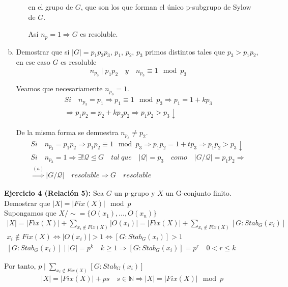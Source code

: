 \documentclass{article}
\begin{document}
\begin{enumerate}[(a)]
\begin{enumerate}[\bfseries C{a}so 1:]
	en el grupo de $G$, que son los que forman el único p-subgrupo de Sylow de $G$. 
	
	Así $n_p=1\Rightarrow G$ es resoluble. 
	\end{enumerate}

\item Demostrar que si $|G|=p_1p_2p_3$, $p_1,\,p_2,\,p_3$ primos distintos tales que $p_3>p_1p_2$, en ese caso $G$ es resoluble
\begin{equation*}
n_{p_3}\mid p_1p_2\quad y\quad n_{p_3}\equiv 1\mod{p_3}
\end{equation*}

Veamos que necesariamente $n_{p_3}=1$.
\begin{gather*}
Si\quad n_{p_3}=p_1\Rightarrow p_1\equiv 1\mod{p_3} \Rightarrow p_1=1+kp_3 \\
\Rightarrow p_1p_2=p_2+kp_3p_2\Rightarrow p_1p_2>p_3\downarrow
\end{gather*}

De la misma forma se demuestra $n_{p_3}\neq p_2$. 
\begin{gather*}
Si\quad n_{p_3}=p_1p_2 \Rightarrow p_1p_2\equiv 1\mod{p_3}\Rightarrow p_1p_2=1+tp_3 \Rightarrow p_1p_2>p_3\downarrow \\
Si\quad n_{p_3}=1\Rightarrow \exists!\mathcal{Q}\unlhd G\quad tal\:que\quad |\mathcal{Q}|=p_3 \quad como \quad |G/\mathcal{Q}|=p_1p_2\Rightarrow \\
\overset{(a)}{\Rightarrow} |G/\mathcal{Q}|\quad resoluble \Rightarrow G\quad resoluble
\end{gather*}
\end{enumerate}

\textbf{Ejercicio 4 (Relación 5):} Sea $G$ un p-grupo y $X$ un G-conjunto finito. Demostrar que $|X|=|Fix(X)|\mod{p}$ \\

Supongamos que $X/\sim=\{O(x_1),\ldots,O(x_n)\}$
\begin{gather*}
|X|=|Fix(X)|+\sum_{x_i\notin Fix(X)}|O(x_i)|=|Fix(X)|+\sum_{x_i\notin Fix(X)} \left[G:Stab_G(x_i)\right] \\
x_i\notin Fix(X)\Leftrightarrow |O(x_i)|>1\Leftrightarrow \left[G:Stab_G(x_i)\right]>1 \\
\left[G:Stab_G(x_i)\right]\mid |G|=p^k \quad k\geq 1\Rightarrow \left[G:Stab_G(x_i)\right]=p^r\quad 0<r\leq k
\end{gather*}

Por tanto, $p\mid \sum_{x_i\notin Fix(X)}\left[G:Stab_G(x_i)\right]$
\begin{gather*}
|X|=|Fix(X)|+ps\quad s\in\mathbb{N}\Rightarrow |X|=|Fix(X)|\mod{p}
\end{gather*}
\end{document}
